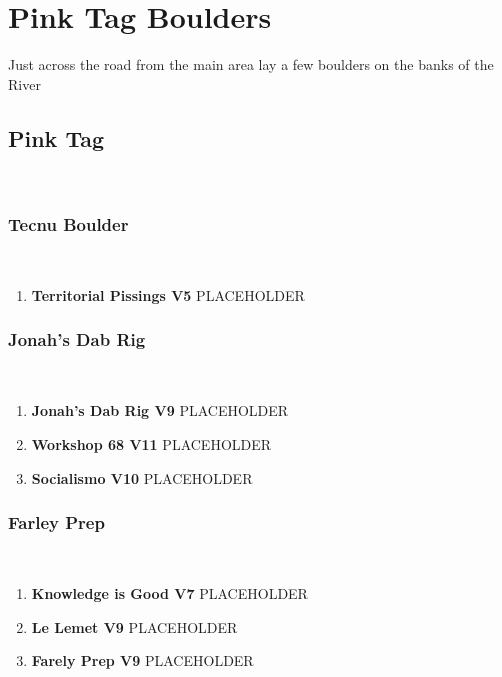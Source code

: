 \chapter{Pink Tag Boulders}\label{a:Pink Tag Boulders}
\lhead{\textcolor{\chapterColor}{\rule[-2pt]{\textwidth}{15pt}}}
Just across the road from the main area lay a few boulders on the banks of the River

\section{Pink Tag}\label{sa:Pink Tag}
\

\subsection*{Tecnu Boulder}\label{bf:Tecnu Boulder}
\

\begin{enumerate}[]
	\item\label{rt:Territorial Pissings} \colorbox{RoyalBlue!20}{\textbf{Territorial Pissings V5  } }
	\newline PLACEHOLDER\
\end{enumerate}
\subsection*{Jonah's Dab Rig}\label{bf:Jonah's Dab Rig}
\

\begin{enumerate}[resume]
	\item\label{rt:Jonah's Dab Rig} \colorbox{Goldenrod!50}{\textbf{Jonah's Dab Rig V9  } }
	\newline PLACEHOLDER\
	\item\label{rt:Workshop 68} \colorbox{red!20}{\textbf{Workshop 68 V11  } }
	\newline PLACEHOLDER\
	\item\label{rt:Socialismo} \colorbox{red!20}{\textbf{Socialismo V10  } }
	\newline PLACEHOLDER\
\end{enumerate}
\subsection*{Farley Prep}\label{bf:Farley Prep}
\

\begin{enumerate}[resume]
	\item\label{rt:Knowledge is Good} \colorbox{Goldenrod!50}{\textbf{Knowledge is Good V7  } }
	\newline PLACEHOLDER\
	\item\label{rt:Le Lemet} \colorbox{Goldenrod!50}{\textbf{Le Lemet V9  } }
	\newline PLACEHOLDER\
	\item\label{rt:Farely Prep} \colorbox{Goldenrod!50}{\textbf{Farely Prep V9  } }
	\newline PLACEHOLDER\
\end{enumerate}
\clearpage